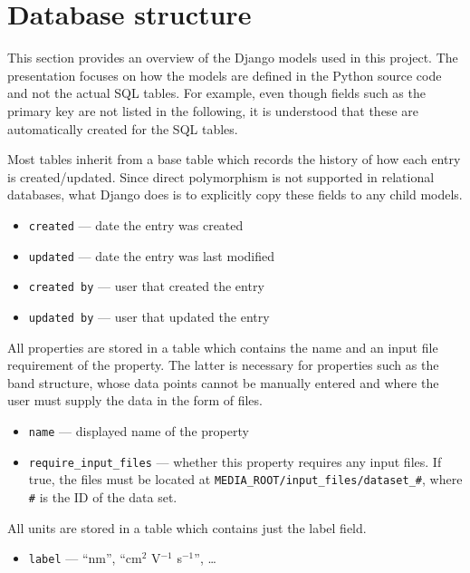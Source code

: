 \documentclass{article}
\begin{document}
\section{Database structure}

This section provides an overview of the Django models used in this project. The presentation focuses on how the models are defined in the Python source code and not the actual SQL tables. For example, even though fields such as the primary key are not listed in the following, it is understood that these are automatically created for the SQL tables.

Most tables inherit from a base table which records the history of how each entry is created/updated. Since direct polymorphism is not supported in relational databases, what Django does is to explicitly copy these fields to any child models.
\begin{tcolorbox}[colback=green!5,colframe=green!40!black,title=Base]
  \begin{itemize}
  \item \texttt{created} --- date the entry was created
  \item \texttt{updated} --- date the entry was last modified
  \item \texttt{created by} --- user that created the entry
  \item \texttt{updated by} --- user that updated the entry
  \end{itemize}
\end{tcolorbox}

All properties are stored in a table which contains the name and an input file requirement of the property. The latter is necessary for properties such as the band structure, whose data points cannot be manually entered and where the user must supply the data in the form of files.
\begin{tcolorbox}[colback=green!5,colframe=green!40!black,title=Property(Base)]
  \begin{itemize}
  \item \texttt{name} --- displayed name of the property
  \item \texttt{require\_input\_files} --- whether this property requires any input files. If true, the files must be located at \verb+MEDIA_ROOT/input_files/dataset_#+, where \verb+#+ is the ID of the data set.
  \end{itemize}
\end{tcolorbox}

All units are stored in a table which contains just the label field.
\begin{tcolorbox}[colback=green!5,colframe=green!40!black,title=Unit(Base)]
  \begin{itemize}
  \item \texttt{label} --- ``nm'', ``cm$^2$ V$^{-1}$ s$^{-1}$'', \ldots
  \end{itemize}
\end{tcolorbox}
\end{document}
